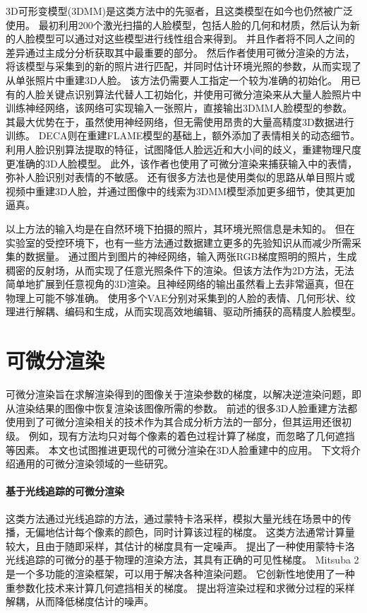 3D可形变模型(3DMM)是这类方法中的先驱者，且这类模型在如今也仍然被广泛使用。
最初\citet{3DMM}利用200个激光扫描的人脸模型，包括人脸的几何和材质，然后认为新的人脸模型可以通过对这些模型进行线性组合来得到。
并且作者将不同人之间的差异通过主成分分析获取其中最重要的部分。
然后作者使用可微分渲染的方法，将该模型与采集到的新的照片进行匹配，并同时估计环境光照的参数，从而实现了从单张照片中重建3D人脸。
该方法仍需要人工指定一个较为准确的初始化。
\citet{deep3d}用已有的人脸关键点识别算法代替人工初始化，并使用可微分渲染来从大量人脸照片中训练神经网络，该网络可实现输入一张照片，直接输出3DMM人脸模型的参数。其最大优势在于，虽然使用神经网络，但无需使用昂贵的大量高精度3D数据进行训练。
DECA\citep{DECA}则在重建FLAME模型的基础上，额外添加了表情相关的动态细节。
\citet{ZielonkaBT22}利用人脸识别算法提取的特征，试图降低人脸远近和大小间的歧义，重建物理尺度更准确的3D人脸模型。
此外，该作者也使用了可微分渲染来捕获输入中的表情，弥补人脸识别对表情的不敏感。
还有很多方法\citep{GarridoVWT13,CaoBZB15,ShiWTC14,IchimBP15}也是使用类似的思路从单目照片或视频中重建3D人脸，并通过图像中的线索为3DMM模型添加更多细节，使其更加逼真。

以上方法的输入均是在自然环境下拍摄的照片，其环境光照信息是未知的。
但在实验室的受控环境下，也有一些方法通过数据建立更多的先验知识从而减少所需采集的数据量。
\citet{MekaHPZFFKYBDDB19}通过图片到图片的神经网络，输入两张RGB梯度照明的照片，生成稠密的反射场，从而实现了任意光照条件下的渲染。但该方法作为2D方法，无法简单地扩展到任意视角的3D渲染。且神经网络的输出虽然看上去非常逼真，但在物理上可能不够准确。
\citet{ZhangZZLCYXY22}使用多个VAE分别对采集到的人脸的表情、几何形状、纹理进行解耦、编码和生成，从而实现高效地编辑、驱动所捕获的高精度人脸模型。

\section{可微分渲染}

可微分渲染旨在求解渲染得到的图像关于渲染参数的梯度，以解决逆渲染问题，即从渲染结果的图像中恢复渲染该图像所需的参数。
前述的很多3D人脸重建方法都使用到了可微分渲染相关的技术作为其合成分析方法的一部分，但其运用还很初级。
例如，现有方法均只对每个像素的着色过程计算了梯度，而忽略了几何遮挡等因素。
本文也试图推进更现代的可微分渲染在3D人脸重建中的应用。
下文将介绍通用的可微分渲染领域的一些研究。

\paragraph{基于光线追踪的可微分渲染}
这类方法通过光线追踪的方法，通过蒙特卡洛采样，模拟大量光线在场景中的传播，无偏地估计每个像素的颜色，同时计算该过程的梯度。
这类方法通常计算量较大，且由于随即采样，其估计的梯度具有一定噪声。
\citet{redner}提出了一种使用蒙特卡洛光线追踪的可微分的基于物理的渲染方法，其具有正确的可见性梯度。
Mitsuba 2\citep{Mitsuba2}是一个多功能的渲染框架，可以用于解决各种渲染问题。
它创新性地使用了一种重参数化技术来计算几何遮挡相关的梯度。
\citet{ZeltnerSGJ21}提出将渲染过程和求微分过程的采样解耦，从而降低梯度估计的噪声。


